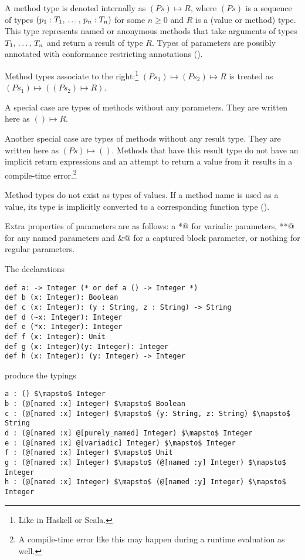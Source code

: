 A method type is denoted internally as $(Ps) \mapsto R$, where $(Ps)$ is a sequence of types  $(p_1 : T_1 ,\, \ldots ,\, p_n : T_n)$ for some $n \geq 0$ and $R$ is a (value or method) type. This type represents named or anonymous methods that take arguments of types $T_1 ,\, \ldots ,\, T_n$ and return a result of type $R$. Types of parameters are possibly annotated with conformance restricting annotations (). 

Method types associate to the right:\footnote{Like in Haskell or Scala.} \newline
$(Ps_1) \mapsto (Ps_2) \mapsto R$ is treated as $(Ps_1) \mapsto ((Ps_2) \mapsto R)$. 

A special case are types of methods without any parameters. They are written here as $() \mapsto R$. 

Another special case are types of methods without any result type. They are written here as $(Ps) \mapsto ()$. Methods that have this result type do not have an implicit return expressions and an attempt to return a value from it results in a compile-time error.\footnote{A compile-time error like this may happen during a runtime evaluation as well.}

Method types do not exist as types of values. If a method name is used as a value, its type is implicitly converted to a corresponding function type (). 

Extra properties of parameters are as follows: a \lstinline@*@ for variadic parameters, \lstinline@**@ for any named parameters and \lstinline@&@ for a captured block parameter, or nothing for regular parameters. 

\example The declarations
\begin{lstlisting}
def a: -> Integer (* or def a () -> Integer *)
def b (x: Integer): Boolean
def c (x: Integer): (y : String, z : String) -> String
def d (~x: Integer): Integer
def e (*x: Integer): Integer
def f (x: Integer): Unit
def g (x: Integer)(y: Integer): Integer
def h (x: Integer): (y: Integer) -> Integer
\end{lstlisting}
produce the typings
\begin{lstlisting}
a : () $\mapsto$ Integer
b : (@[named :x] Integer) $\mapsto$ Boolean
c : (@[named :x] Integer) $\mapsto$ (y: String, z: String) $\mapsto$ String
d : (@[named :x] @[purely_named] Integer) $\mapsto$ Integer
e : (@[named :x] @[variadic] Integer) $\mapsto$ Integer
f : (@[named :x] Integer) $\mapsto$ Unit
g : (@[named :x] Integer) $\mapsto$ (@[named :y] Integer) $\mapsto$ Integer
h : (@[named :x] Integer) $\mapsto$ (@[named :y] Integer) $\mapsto$ Integer
\end{lstlisting}

